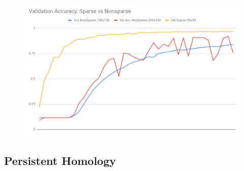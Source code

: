 \documentclass[12pt, a4paper, twocolumn, fullpage]{article}
\theoremstyle{plain}
\theoremstyle{definition}
\theoremstyle{remark}
\begin{document}
    \begin{figure}[t]
      \includegraphics[width=\linewidth]{ValAccSparsevsNonsparse.png}
      \caption{}
      \label{ValAccSparsevsNonsparse}
    \end{figure}

\subsection{Persistent Homology}


%
%
%
%
%
%
%
\end{document}
